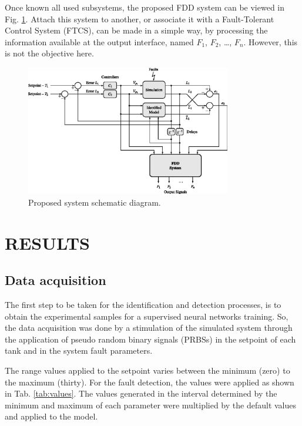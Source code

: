 \documentclass[10pt,fleqn,a4paper]{article}
\newcommand{\sequencia}[4]{$#1_{#2}$, $#1_{#3}$, \ldots, $#1_{#4}$}
\begin{document}
Once known all used subsystems, the proposed FDD system can be viewed in Fig.
\ref{fig:comp}. Attach this system to another, or associate it with a
Fault-Tolerant Control System (FTCS), can be made in a simple way, by processing
the information available at the output interface, named
\sequencia{F}{1}{2}{n}. However, this is not the objective here.

\begin{figure}[htb]
\centering
    \includegraphics[width=0.8\textwidth]{imgs/comp}
    \caption{Proposed system schematic diagram.}
    \label{fig:comp}
\end{figure}

\section{RESULTS}\label{sec:results}

\subsection{Data acquisition}
The first step to be taken for the identification and detection processes, is to
obtain the experimental samples for a supervised neural networks training. So,
the data acquisition was done by a stimulation of the simulated system through
the application of pseudo random binary signals (PRBSs) in the setpoint of each
tank and in the system fault parameters.

The range values applied to the setpoint varies between the minimum (zero) to
the maximum (thirty). For the fault detection, the values were applied as shown
in Tab. \ref{tab:values}. The values generated in the interval determined by the
minimum and maximum of each parameter were multiplied by the default values and
applied to the model.
\end{document}
